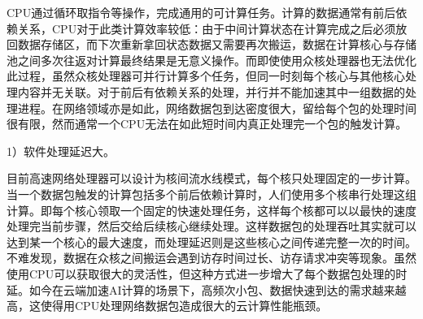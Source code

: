 




 \label{chap33}


CPU通过循环取指令等操作，完成通用的可计算任务。计算的数据通常有前后依赖关系，CPU对于此类计算效率较低：由于中间计算状态在计算完成之后必须放回数据存储区，而下次重新拿回状态数据又需要再次搬运，数据在计算核心与存储池之间多次往返对计算最终结果是无意义操作。而即使使用众核处理器也无法优化此过程，虽然众核处理器可并行计算多个任务，但同一时刻每个核心与其他核心处理内容并无关联。对于前后有依赖关系的处理，并行并不能加速其中一组数据的处理进程。在网络领域亦是如此，网络数据包到达密度很大，留给每个包的处理时间很有限，然而通常一个CPU无法在如此短时间内真正处理完一个包的触发计算。


1）软件处理延迟大。

目前高速网络处理器可以设计为核间流水线模式，每个核只处理固定的一步计算。当一个数据包触发的计算包括多个前后依赖计算时，人们使用多个核串行处理这组计算。即每个核心领取一个固定的快速处理任务，这样每个核都可以以最快的速度处理完当前步骤，然后交给后续核心继续处理。这样数据包的处理吞吐其实就可以达到某一个核心的最大速度，而处理延迟则是这些核心之间传递完整一次的时间。不难发现，数据在众核之间搬运会遇到访存时间过长、访存请求冲突等现象。虽然使用CPU可以获取很大的灵活性，但这种方式进一步增大了每个数据包处理的时延。如今在云端加速AI计算的场景下，高频次小包、数据快速到达的需求越来越高，这使得用CPU处理网络数据包造成很大的云计算性能瓶颈。

